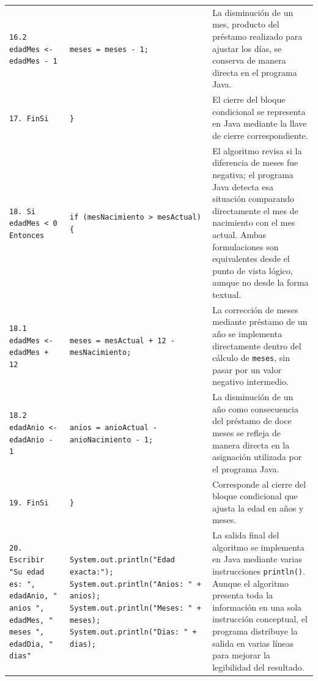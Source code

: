 \documentclass[12pt,twoside]{book}
\begin{document}
\begin{landscape}
\begin{longtable}{p{6cm} p{6cm} p{7cm}}
							
							\texttt{16.2 edadMes <- edadMes - 1}
							&
							\texttt{meses = meses - 1;}
							&
							La disminución de un mes, producto del préstamo realizado para ajustar los días, se conserva de manera directa en el programa Java. \\
							
							
							\texttt{17. FinSi}
							&
							\texttt{\}}
							&
							El cierre del bloque condicional se representa en Java mediante la llave de cierre correspondiente. \\
							
							
							\texttt{18. Si edadMes < 0 Entonces}
							&
							\texttt{if (mesNacimiento > mesActual) \{}
							&
							El algoritmo revisa si la diferencia de meses fue negativa; el programa Java detecta esa situación comparando directamente el mes de nacimiento con el mes actual. Ambas formulaciones son equivalentes desde el punto de vista lógico, aunque no desde la forma textual. \\
							
							
							\texttt{18.1 edadMes <- edadMes + 12}
							&
							\texttt{meses = mesActual + 12 - mesNacimiento;}
							&
							La corrección de meses mediante préstamo de un año se implementa directamente dentro del cálculo de \texttt{meses}, sin pasar por un valor negativo intermedio. \\
							
							
							\texttt{18.2 edadAnio <- edadAnio - 1}
							&
							\texttt{anios = anioActual - anioNacimiento - 1;}
							&
							La disminución de un año como consecuencia del préstamo de doce meses se refleja de manera directa en la asignación utilizada por el programa Java. \\
							
							
							\texttt{19. FinSi}
							&
							\texttt{\}}
							&
							Corresponde al cierre del bloque condicional que ajusta la edad en años y meses. \\
							
							
							\texttt{20. Escribir "Su edad es: ", edadAnio, " anios ", edadMes, " meses ", edadDia, " dias"}
							&
							\texttt{System.out.println("Edad exacta:");} \newline
							\texttt{System.out.println("Anios: " + anios);} \newline
							\texttt{System.out.println("Meses: " + meses);} \newline
							\texttt{System.out.println("Dias: " + dias);}
							&
							La salida final del algoritmo se implementa en Java mediante varias instrucciones \texttt{println()}. Aunque el algoritmo presenta toda la información en una sola instrucción conceptual, el programa distribuye la salida en varias líneas para mejorar la legibilidad del resultado. \\
							

\end{longtable}
\end{landscape}
\end{document}

